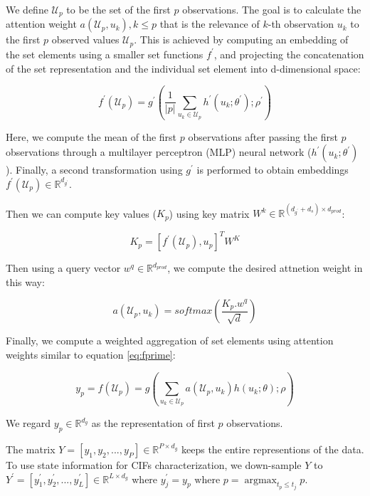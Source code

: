 \documentclass[journal,twoside,web]{ieeecolor}
\DeclareMathOperator*{\argmax}{argmax} %
\begin{document}
We define $\mathcal{U}_p$ to be the set of the first $p$ observations.
The goal is to calculate the attention weight $a(\mathcal{U}_p,u_k ), k \leq p$ that is the relevance of $k$-th observation $u_k$ to the first $p$ observed values $\mathcal{U}_p$.
This is achieved by computing an embedding of the set elements using a smaller set functions $f^{\prime}$, and projecting the concatenation of the set representation and the individual set element into d-dimensional space:



\begin{equation}\label{eq:fprime}
   f^{\prime}(\mathcal{U}_p) = g^{\prime} \left(  \frac{1}{|p|} \sum_{u_k \in \mathcal{U}_p}  h^{\prime}(u_k;\theta^{\prime}) ;\rho^{\prime}\right) 
\end{equation}

Here, we compute the mean of the first $p$ observations after passing the first $p$ observations through a multilayer perceptron (MLP) neural network ($h^{\prime}(u_k;\theta^{\prime})$). Finally, a second transformation using $g^{\prime}$ is performed to obtain embeddings $f^{\prime}(\mathcal{U}_p) \in \mathbb{R}^{d_{g^{\prime}}}$.


Then we can compute key values ($ K_p$) using key matrix $W^k \in \mathbb{R}^{(d_{g^{\prime}}+d_s) \times d_{prod}}$:


\begin{equation}
    K_p=[f^{\prime}(\mathcal{U}_p), u_p]^T W^K   
\end{equation}

Then using a query vector $w^q \in \mathbb{R}^{d_{prod}}$, we compute the desired attnetion weight in this way:

\begin{equation}
    a(\mathcal{U}_p,u_k)=  softmax(\frac{K_p.w^q}{\sqrt{d}  })
\end{equation}


Finally, we compute a weighted aggregation of set elements using attention weights similar to equation \ref*{eq:fprime}:

\begin{equation*}
    y_p=f(\mathcal{U}_p) =     
    g\left(
    \sum_{u_k \in \mathcal{U}_p}  a(\mathcal{U}_p,u_k)h(u_k;\theta);\rho 
    \right) 
\end{equation*}

We regard $y_p \in \mathbb{R}^{d_g}$ as the representation of first $p$ observations.

The matrix $Y=[y_1,y_2,...,y_P] \in \mathbb{R}^{P \times d_g}$ keeps the entire representions of the data. To use state information for CIFs characterization, we down-sample $Y$ to $Y^{\prime}=[y^{\prime}_1,y^{\prime}_2,...,y^{\prime}_L]  \in \mathbb{R}^{L \times d_g}$ where $ y^{\prime}_j=y_p \text{ where } p=\argmax_{t_p \leq t_j} p$.
\end{document}

